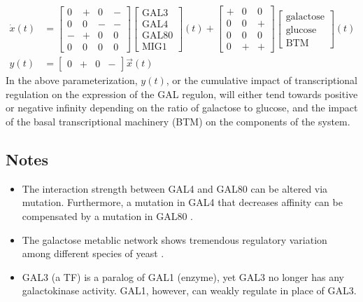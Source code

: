 \documentclass[11 pt]{article}
\begin{document}
    \begin{align*}
      \dot{x}(t) &= \begin{bmatrix} 0 & + & 0 & - \\ 0 & 0 & - & - \\ - & + & 0 & 0 \\ 0 & 0 & 0 & 0 \end{bmatrix} \begin{bmatrix} \text{GAL3} \\ \text{GAL4} \\ \text{GAL80} \\ \text{MIG1} \end{bmatrix}(t) + \begin{bmatrix} + & 0 & 0 \\ 0 & 0 & + \\ 0 & 0 & 0 \\ 0 & + & + \end{bmatrix} \begin{bmatrix} \text{galactose} \\ \text{glucose} \\ \text{BTM} \end{bmatrix}(t) \\
        y(t) &= \begin{bmatrix} 0 & + & 0 & - \end{bmatrix} \vec{x}(t)
    \end{align*}
    In the above parameterization, $y(t)$, or the cumulative impact of transcriptional regulation on the expression of the GAL regulon, will either tend towards positive or negative infinity depending on the ratio of galactose to glucose, and the impact of the basal transcriptional machinery (BTM) on the components of the system.
    
    \subsection{Notes}
    \begin{itemize}
      \item The interaction strength between GAL4 and GAL80 can be altered via mutation. Furthermore, a mutation in GAL4 that decreases affinity can be compensated by a mutation in GAL80 \citep{li2010alterations, salmeron1990gal4, adhikari2014perturbation}.
      \item The galactose metablic network shows tremendous regulatory variation among different species of yeast \citep{lavoie2009rearrangements, martchenko2007transcriptional, dalal2016transcriptional, christensen2011unique, hartl2007induction, alam2013aspergillus}.
      \item GAL3 (a TF) is a paralog of GAL1 (enzyme), yet GAL3 no longer has any galactokinase activity. GAL1, however, can weakly regulate in place of GAL3.
    \end{itemize}




\end{document}
